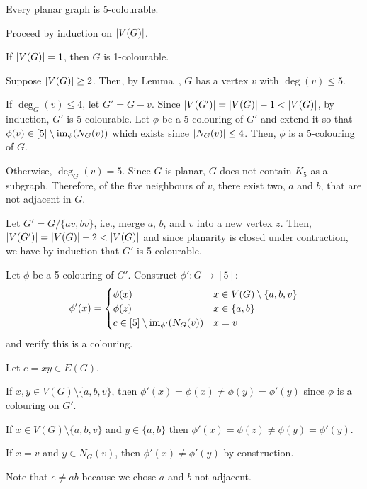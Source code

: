 \documentclass[class=math239,notes,tikz]{agony}
\begin{document}
\begin{theorem}
  Every planar graph is 5-colourable.
\end{theorem}
\begin{prf}
  Proceed by induction on $\abs{V(G)}$.

  If $\abs{V(G)} = 1$, then $G$ is 1-colourable.

  Suppose $\abs{V(G)} \geq 2$. Then, by Lemma~,
  $G$ has a vertex $v$ with $\deg(v) \leq 5$.

  If $\deg_G(v) \leq 4$, let $G' = G-v$.
  Since $\abs{V(G')} = \abs{V(G)} - 1 < \abs{V(G)}$,
  by induction, $G'$ is 5-colourable.
  Let $\phi$ be a 5-colouring of $G'$
  and extend it so that $\phi(v) \in [5] \setminus \operatorname{im}_\phi(N_G(v))$
  which exists since $\abs{N_G(v)} \leq 4$.
  Then, $\phi$ is a 5-colouring of $G$.

  Otherwise, $\deg_G(v) = 5$.
  Since $G$ is planar, $G$ does not contain $K_5$ as a subgraph.
  Therefore, of the five neighbours of $v$,
  there exist two, $a$ and $b$, that are not adjacent in $G$.

  Let $G' = G / \{av,bv\}$, i.e., merge $a$, $b$, and $v$ into a new vertex $z$.
  Then, $\abs{V(G')} = \abs{V(G)} - 2 < \abs{V(G)}$
  and since planarity is closed under contraction,
  we have by induction that $G'$ is 5-colourable.

  Let $\phi$ be a 5-colouring of $G'$.
  Construct $\phi' : G \to [5]$:
  \[
    \phi'(x) = \begin{cases}
      \phi(x)                                 & x \in V(G) \setminus \{a,b,v\} \\
      \phi(z)                                 & x \in \{a,b\}                  \\
      c \in [5] \setminus \operatorname{im}_{\phi'}(N_G(v)) & x = v
    \end{cases}
  \]
  and verify this is a colouring.

  Let $e = xy \in E(G)$.

  If $x,y \in V(G) \setminus \{a,b,v\}$,
  then $\phi'(x) = \phi(x) \neq \phi(y) = \phi'(y)$
  since $\phi$ is a colouring on $G'$.

  If $x \in V(G) \setminus\{a,b,v\}$ and $y \in \{a,b\}$
  then $\phi'(x) = \phi(z) \neq \phi(y) = \phi'(y)$.

  If $x = v$ and $y \in N_G(v)$, then $\phi'(x) \neq \phi'(y)$ by construction.

  Note that $e \neq ab$ because we chose $a$ and $b$ not adjacent.
\end{prf}
\end{document}
